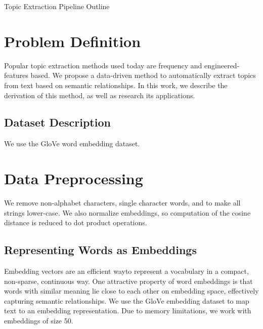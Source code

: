 \documentclass[12pt]{article}
\begin{document}
\begin{center}

Topic Extraction Pipeline Outline


\end{center}

\section{Problem Definition}
Popular topic extraction methods used today are frequency and engineered-features based. We propose a data-driven method to automatically extract topics from text based on semantic relationships. In this work, we describe the derivation of this method, as well as research its applications.

\subsection{Dataset Description}
We use the GloVe word embedding dataset.

\section{Data Preprocessing}

We remove non-alphabet characters, single character words, and to make all strings lower-case. We also normalize embeddings, so computation of the cosine distance is reduced to dot product operations.\\


\subsection{Representing Words as Embeddings}
 Embedding vectors are an efficient wayto represent a vocabulary in a compact, non-sparse, continuous way. One attractive property of word embeddings is that words with similar meaning lie close to each other on embedding space, effectively capturing semantic relationships. We use the GloVe embedding dataset to map text to an embedding representation.
Due to memory limitations, we work with embeddings of size 50.
\end{document}
